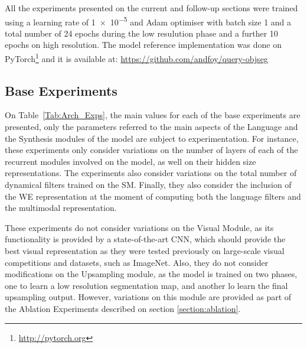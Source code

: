 All the experiments presented on the current and follow-up sections were trained using a learning rate of \num{1e-5} and Adam \cite{DBLP:journals/corr/KingmaB14} optimiser with batch size 1 and a total number of 24 epochs during the low resulution phase and a further 10 epochs on high resolution. The model reference implementation was done on PyTorch\footnote{\url{http://pytorch.org}} and it is available at: \url{https://github.com/andfoy/query-objseg}


\subsection{Base Experiments}
\label{section:base}
On Table~\ref{Tab:Arch_Exps}, the main values for each of the base experiments are presented, only the parameters referred to the main aspects of the Language and the Synthesis modules of the model are subject to experimentation. For instance, these experiments only consider variations on the number of layers of each of the recurrent modules involved on the model, as well on their hidden size representations. The experiments also consider variations on the total number of dynamical filters trained on the SM. Finally, they also consider the inclusion of the WE representation at the moment of computing both the language filters and the multimodal representation.

These experiments do not consider variations on the Visual Module, as its functionality is provided by a state-of-the-art CNN, which should provide the best visual representation as they were tested previously on large-scale visual competitions and datasets, such as ImageNet. Also, they do not consider modifications on the Upsampling module, as the model is trained on two phases, one to learn a low resolution segmentation map, and another lo learn the final upsampling output. However, variations on this module are provided as part of the Ablation Experiments described on section \ref{section:ablation}.

